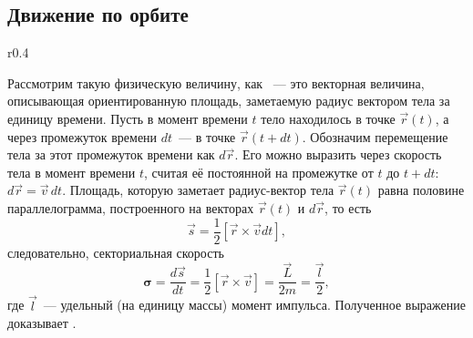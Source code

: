 \subsection{Движение по орбите}

\begin{wrapfigure}[8]{r}{0.4\tw}
    \centering
    \vspace{-0.75pc}
    \caption{}
\end{wrapfigure}
Рассмотрим такую физическую величину, как ~--- это векторная величина, описывающая ориентированную площадь, заметаемую радиус вектором тела за единицу времени. Пусть в момент времени $t$ тело находилось в точке $\vec{r}(t)$, а через промежуток времени $dt$~--- в точке $\vec{r}(t + dt)$. Обозначим перемещение тела за этот промежуток времени как $d\vec{r}$. Его можно выразить через скорость тела в момент времени $t$, считая её постоянной на промежутке от $t$ до $t + dt$: $d\vec{r} = \vec{v} \,d t$. Площадь, которую заметает радиус-вектор тела $\vec{r}(t)$ равна половине параллелограмма, построенного на векторах $\vec{r}(t)$ и $d\vec{r}$, то есть
\begin{equation*}
    \vec{s} = \frac{1}{2} [\vec{r} \times \vec{v} dt],
\end{equation*}
следовательно, секториальная скорость
\begin{equation*}
    \boldsymbol{\sigma} = \frac{d \vec{s}}{dt} = \frac{1}{2} [\vec{r} \times \vec{v}]  = \frac{\vec{L}}{2m} = \frac{\vec{l}}{2},
\end{equation*}
где $\vec{l}$~--- удельный (на единицу массы) момент импульса. Полученное выражение доказывает .

